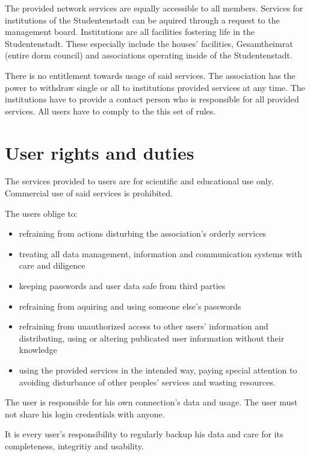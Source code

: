 \documentclass[a4paper,10pt]{scrartcl}
\begin{document}
 The provided network services are equally accessible to all members. 
 Services for institutions of the Studentenstadt can be aquired through a request to the management board. Institutions are all facilities fostering life in the Studentenstadt. These especially include the houses' facilities, Gesamtheimrat (entire dorm council) and associations operating inside of the Studentenstadt.

 There is no entitlement towards usage of said services. The association has the power to withdraw single or all to institutions provided services at any time. The institutions have to provide a contact person who is responsible for all provided services. All users have to comply to the this set of rules.

 \section{User rights and duties}
  The services provided to users are for scientific and educational use only. Commercial use of said services is prohibited.

 The users oblige to:

 \begin{itemize}
         \item refraining from actions disturbing the association's orderly services
         \item treating all data management, information and communication systems with care and diligence
         \item keeping passwords and user data safe from third parties
         \item refraining from aquiring and using someone else's passwords
         \item refraining from unauthorized access to other users' information and distributing, using or altering publicated user information without their knowledge
         \item using the provided services in the intended way, paying special attention to avoiding disturbance of other peoples' services and wasting resources.
 \end{itemize}

 The user is responsible for his own connection's data and usage. The user must not share his login credentials with anyone.

 It is every user's responsibility to regularly backup his data and care for its completeness, integritiy and usability.
\end{document}
